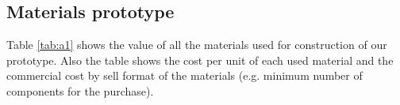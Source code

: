 \documentclass[12pt,letterpaper]{article}
\numberwithin{figure}{section}
\numberwithin{equation}{section}
\numberwithin{table}{section}
\begin{document}
\newpage
{}
\renewcommand\refname{References}





\newpage
{}
\renewcommand{\thefigure}{A-\arabic{figure}}
\renewcommand{\thetable}{A-\arabic{table}}
\renewcommand{\appendixtocname}{Appendix}
\renewcommand{\appendixpagename}{{\Large Appendix}}
\renewcommand{\appendixname}{Appendix}
\begin{appendices}
\makeatletter
{}
\makeatother
\section{Materials prototype}\label{anexo:1}

Table \ref{tab:a1} shows the value of all the materials used for construction of our prototype. Also the table shows the cost per unit of each used material and the commercial cost by sell format of the materials (e.g. minimum number of components for the purchase). 
 

\end{appendices}
\end{document}
